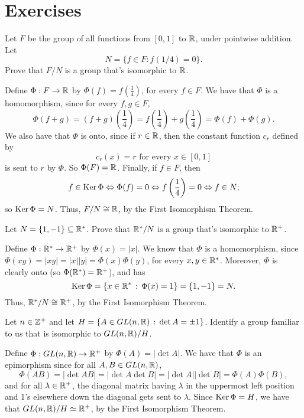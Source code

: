 \pagebreak

\section{Exercises}

\begin{exercise} Let $F$ be the group of all functions from $[0,1]$ to
$\mathbb{R}$, under pointwise addition. Let $$N=\{f\in F:
f(1/4)=0\}.$$  Prove that $F/N$ is a group that's
isomorphic to $\mathbb{R}$.
\end{exercise}

\begin{solution}[print=false]
Define $\Phi:F\rightarrow \mathbb{R}$ by
$\Phi(f)=f\left(\frac{1}{4}\right)$, for every $f\in F$. We have
that $\Phi$ is a homomorphism, since for every $f, g\in F$,
$$\Phi(f+g)=(f+g)\left(\frac{1}{4}\right)=f\left(\frac{1}{4}\right)+g\left(\frac{1}{4}\right)=\Phi(f)+\Phi(g).$$
We also have that $\Phi$ is onto, since if $r\in \mathbb{R}$, then the
constant function $c_r$ defined by $$c_r(x)=r \mbox{ for every $x\in
[0,1]$}$$ is sent to $r$ by $\Phi$.  So $\Phi(F)=\mathbb{R}$. Finally, if
$f\in F$, then
$$f\in \operatorname{Ker} \Phi \Leftrightarrow \Phi(f)=0 \Leftrightarrow
f\left(\frac{1}{4}\right)=0 \Leftrightarrow f\in N;$$ so $\operatorname{Ker}
\Phi=N$.  Thus, $F/N \cong \mathbb{R}$, by the First Isomorphism Theorem.
\end{solution}

\begin{exercise}  Let $N=\{1,-1\}\subseteq \mathbb{R}^*$. Prove that $\mathbb{R}^*/N$ is
 a group that's isomorphic to
$\mathbb{R}^+$.
\end{exercise}

\begin{solution}[print=false]
Define $\Phi: \mathbb{R}^* \rightarrow \mathbb{R}^+$ by
$\Phi(x)=|x|$. We know that $\Phi$ is a homomorphism, since
$\Phi(xy)=|xy|=|x||y|=\Phi(x)\Phi(y)$, for every $x,y\in \mathbb{R}^*$.
Moreover, $\Phi$ is clearly onto (so $\Phi(\mathbb{R}^*)=\mathbb{R}^+$), and
has
$$\operatorname{Ker} \Phi=\{x\in \mathbb{R}^*\,:\,\Phi(x)=1\}=\{1,-1\}=N.$$  Thus,
$\mathbb{R}^*/N \cong \mathbb{R}^+$, by the First Isomorphism Theorem.
\end{solution}

\begin{exercise} Let $n\in \mathbb{Z}^+$ and let $H=\{A\in GL(n,\mathbb{R})\,:\, \det A =\pm
1\}$.  Identify a group familiar to us that is isomorphic to
$GL(n,\mathbb{R})/H$.
\end{exercise}

\begin{solution}[print=false]
Define $\Phi:GL(n,\mathbb{R})\to \mathbb{R}^+$ by
$\Phi(A)=|\det A|$.  We have that $\Phi$ is an epimorphism since for
all $A,B\in GL(n,\mathbb{R})$, $$\Phi(AB)=|\det AB|=|\det A \det B|=|\det
A||\det B|=\Phi(A)\Phi(B),$$ and for all $\lambda \in \mathbb{R}^+$, the
diagonal matrix having $\lambda$ in the uppermost left position and
1's elsewhere down the diagonal gets sent to $\lambda$. Since $\operatorname{Ker}
\Phi=H$, we have that $GL(n,\mathbb{R})/H \simeq \mathbb{R}^+$, by the First
Isomorphism Theorem.
\end{solution}

